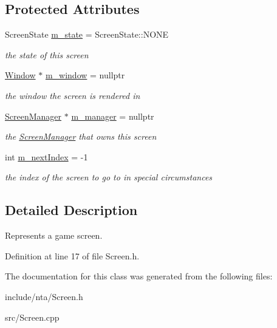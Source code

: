 \subsection*{Protected Attributes}
\begin{DoxyCompactItemize}
\item 
\mbox{\label{classnta_1_1Screen_a68d2c095aadfb248263f43cb12cd34a1}} 
Screen\+State \hyperlink{classnta_1_1Screen_a68d2c095aadfb248263f43cb12cd34a1}{m\+\_\+state} = Screen\+State\+::\+N\+O\+NE
\begin{DoxyCompactList}\small\item\em the state of this screen \end{DoxyCompactList}\item 
\mbox{\label{classnta_1_1Screen_a712bfbeb6f85d9c4229de9b974b05e58}} 
\hyperlink{classnta_1_1Window}{Window} $\ast$ \hyperlink{classnta_1_1Screen_a712bfbeb6f85d9c4229de9b974b05e58}{m\+\_\+window} = nullptr
\begin{DoxyCompactList}\small\item\em the window the screen is rendered in \end{DoxyCompactList}\item 
\mbox{\label{classnta_1_1Screen_a3496a69b02f4b120d907042d3201deff}} 
\hyperlink{classnta_1_1ScreenManager}{Screen\+Manager} $\ast$ \hyperlink{classnta_1_1Screen_a3496a69b02f4b120d907042d3201deff}{m\+\_\+manager} = nullptr
\begin{DoxyCompactList}\small\item\em the \hyperlink{classnta_1_1ScreenManager}{Screen\+Manager} that owns this screen \end{DoxyCompactList}\item 
\mbox{\label{classnta_1_1Screen_a6be3b899f3bc9e531d64676cbbd6815e}} 
int \hyperlink{classnta_1_1Screen_a6be3b899f3bc9e531d64676cbbd6815e}{m\+\_\+next\+Index} = -\/1
\begin{DoxyCompactList}\small\item\em the index of the screen to go to in special circumstances \end{DoxyCompactList}\end{DoxyCompactItemize}


\subsection{Detailed Description}
Represents a game screen. 

Definition at line 17 of file Screen.\+h.



The documentation for this class was generated from the following files\+:\begin{DoxyCompactItemize}
\item 
include/nta/Screen.\+h\item 
src/Screen.\+cpp\end{DoxyCompactItemize}
